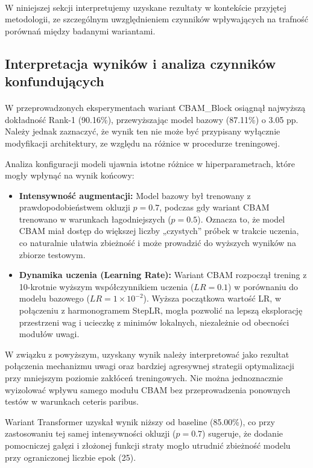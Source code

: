 \paragraph{}W niniejszej sekcji interpretujemy uzyskane rezultaty w kontekście przyjętej metodologii, ze szczególnym uwzględnieniem czynników wpływających na trafność porównań między badanymi wariantami.

\subsection{Interpretacja wyników i analiza czynników konfundujących}
\paragraph{}W przeprowadzonych eksperymentach wariant CBAM\_Block osiągnął najwyższą dokładność Rank-1 (90.16\%), przewyższając model bazowy (87.11\%) o 3.05 pp. Należy jednak zaznaczyć, że wynik ten nie może być przypisany wyłącznie modyfikacji architektury, ze względu na różnice w procedurze treningowej.

Analiza konfiguracji modeli ujawnia istotne różnice w hiperparametrach, które mogły wpłynąć na wynik końcowy:
\begin{itemize}
	\item \textbf{Intensywność augmentacji:} Model bazowy był trenowany z prawdopodobieństwem okluzji $p=0.7$, podczas gdy wariant CBAM trenowano w warunkach łagodniejszych ($p=0.5$). Oznacza to, że model CBAM miał dostęp do większej liczby „czystych” próbek w trakcie uczenia, co naturalnie ułatwia zbieżność i może prowadzić do wyższych wyników na zbiorze testowym.
	\item \textbf{Dynamika uczenia (Learning Rate):} Wariant CBAM rozpoczął trening z 10-krotnie wyższym współczynnikiem uczenia ($LR=0.1$) w porównaniu do modelu bazowego ($LR=1\times10^{-2}$). Wyższa początkowa wartość LR, w połączeniu z harmonogramem StepLR, mogła pozwolić na lepszą eksplorację przestrzeni wag i ucieczkę z minimów lokalnych, niezależnie od obecności modułów uwagi.
\end{itemize}

W związku z powyższym, uzyskany wynik należy interpretować jako rezultat połączenia mechanizmu uwagi oraz bardziej agresywnej strategii optymalizacji przy mniejszym poziomie zakłóceń treningowych. Nie można jednoznacznie wyizolować wpływu samego modułu CBAM bez przeprowadzenia ponownych testów w warunkach ceteris paribus.

Wariant Transformer uzyskał wynik niższy od baseline (85.00\%), co przy zastosowaniu tej samej intensywności okluzji ($p=0.7$) sugeruje, że dodanie pomocniczej gałęzi i złożonej funkcji straty mogło utrudnić zbieżność modelu przy ograniczonej liczbie epok (25).

